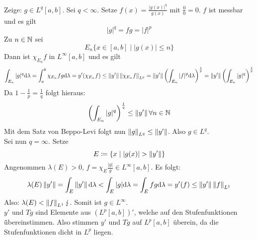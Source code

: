 \begin{beweis}
	Zeige: $ g\in L^q[a,b] $. Sei $ q<\infty $. Setze $ f(x)=\frac{|g(x)|^q}{g(x)} $ mit $ \frac{0}{0}=0 $. $ f $ ist messbar und es gilt
	\[ |g|^q=fg=|f|^p \]
	Zu $ n\in\mathbb{N} $ sei
	\[ E_n\lbrace x\in[a,b]\mid |g(x)|\leq n\rbrace \]
	Dann ist $ \chi_{E_n}f $ in $ L^\infty[a,b] $ und es gilt
	\[ \int_{E_n} |g|^q\mathrm d\lambda=\int_a^b\chi_{E_n}fg\mathrm d\lambda=y'(\chi_{E_n}f)\leq\left\|y'\right\|\left\|\chi_{E_n}f\right\|_{L^p}=\left\|y'\right\|\left(\int_{E_n}|f|^p\mathrm d\lambda\right)^\frac{1}{p}=\left\|y'\right\|\left(\int_{E_n}|g|^q\right)^\frac{1}{p} \]
	Da $ 1-\frac{1}{p}=\frac{1}{q} $ folgt hieraus:
	\[ \left(\int_{E_n}|g|^q\right)^\frac{1}{q}\leq\left\|y'\right\|\forall n\in\mathbb{N} \]
	Mit dem Satz von Beppo-Levi folgt nun $ \left\|g\right\|_{L^q}\leq\left\|y'\right\| $. Also $ g\in L^q $.\\
	Sei nun $ q=\infty $. Setze
	\[ E\coloneqq\lbrace x\mid |g(x)|>\norm{y'}\rbrace \]
	Angenommen $ \lambda(E)>0 $, $ f=\chi_E\frac{|g|}{g}\in L^\infty[a,b] $. Es folgt:
	\[ \lambda(E)\left\|y'\right\|=\int_E\left\|y'\right\|\mathrm d\lambda<\int_E|g|\mathrm d\lambda=\int_E fg\mathrm d\lambda=y'(f)\leq\left\|y'\right\|\left\|f\right\|_{L^1} \]
	Also: $ \lambda(E)<\left\|f\right\|_{L^1}\lightning $. Somit ist $ g\in L^\infty $.\\
	$ y' $ und $ Tg $ sind Elemente aus $ (L^p[a,b])' $, welche auf den Stufenfunktionen \"übereinstimmen. Also stimmen $ y' $ und $ Tg $ auf $ L^p[a,b] $ \"uberein, da die Stufenfunktionen dicht in $ L^p $ liegen.
\end{beweis}

